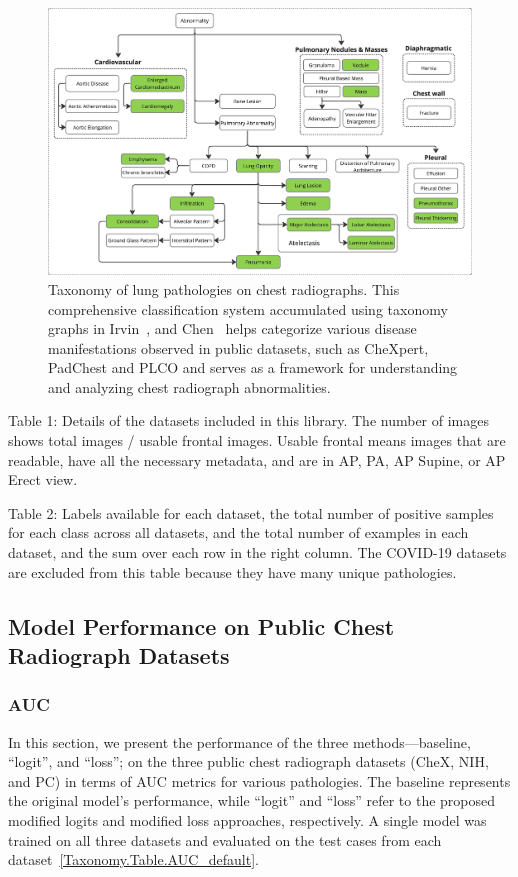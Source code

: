 \documentclass[preprint,3p,times, review]{elsarticle}
\begin{document}
\begin{figure}[htbp]
    \centering
    \includegraphics[width=\textwidth]{figures/image1.png}
    \caption{Taxonomy of lung pathologies on chest radiographs. This comprehensive classification system accumulated using taxonomy graphs in Irvin~\cite{1902693:27875857}, and Chen~\cite{1902693:27875851} helps categorize various disease manifestations observed in public datasets, such as CheXpert, PadChest and PLCO and serves as a framework for understanding and analyzing chest radiograph abnormalities.}%
    \label{Taxonomy.Fig.1.taxonomy_structure}
\end{figure}


Table 1: Details of the datasets included in this library. The number of images shows total images / usable frontal images. Usable frontal means images that are readable, have all the necessary metadata, and are in AP, PA, AP Supine, or AP Erect view.


Table 2: Labels available for each dataset, the total number of positive samples for each class across all datasets, and the total number of examples in each dataset, and the sum over each row in the right column. The COVID-19 datasets are excluded from this table because they have many unique pathologies.


\subsection{Model Performance on Public Chest Radiograph Datasets}

\subsubsection*{AUC}
In this section, we present the performance of the three methods—baseline, ``logit'', and ``loss''; on the three public chest radiograph datasets (CheX, NIH, and PC) in terms of AUC metrics for various pathologies. The baseline represents the original model's performance, while ``logit'' and ``loss'' refer to the proposed modified logits and modified loss approaches, respectively. A single model was trained on all three datasets and evaluated on the test cases from each dataset~\ref{Taxonomy.Table.AUC_default}.
\end{document}

